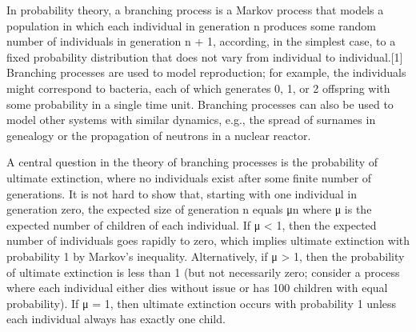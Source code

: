 In probability theory, a branching process is a Markov process that models a population in which each individual in generation n produces some random number of individuals in generation n + 1, according, in the simplest case, to a fixed probability distribution that does not vary from individual to individual.[1] Branching processes are used to model reproduction; for example, the individuals might correspond to bacteria, each of which generates 0, 1, or 2 offspring with some probability in a single time unit. Branching processes can also be used to model other systems with similar dynamics, e.g., the spread of surnames in genealogy or the propagation of neutrons in a nuclear reactor.

A central question in the theory of branching processes is the probability of ultimate extinction, where no individuals exist after some finite number of generations. It is not hard to show that, starting with one individual in generation zero, the expected size of generation n equals μn where μ is the expected number of children of each individual. If μ < 1, then the expected number of individuals goes rapidly to zero, which implies ultimate extinction with probability 1 by Markov's inequality. Alternatively, if μ > 1, then the probability of ultimate extinction is less than 1 (but not necessarily zero; consider a process where each individual either dies without issue or has 100 children with equal probability). If μ = 1, then ultimate extinction occurs with probability 1 unless each individual always has exactly one child.
